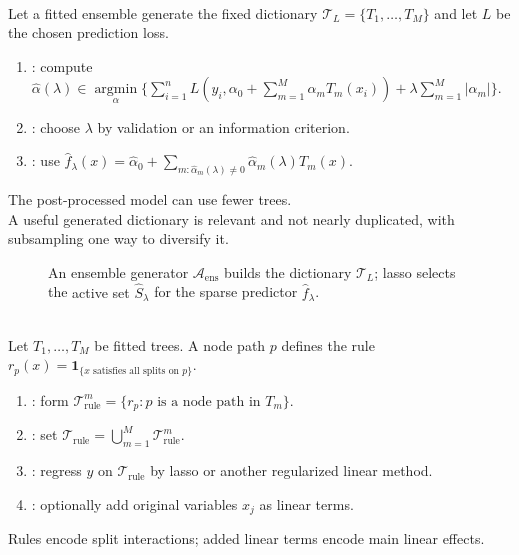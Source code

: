 \begin{method} \label{meth:sl-lasso-postprocessed-ensembles} \\
Let a fitted ensemble generate the fixed dictionary $\mathcal T_L=\{T_1,\ldots,T_M\}$ and let $L$ be the chosen prediction loss.
\begin{enumerate}[label=(\roman*)]
\setlength{\itemsep}{0pt}
\item {}: compute $\widehat{\alpha}(\lambda)\in\operatorname*{argmin}\limits_{\alpha}\{\sum\limits_{i=1}^n L(y_i,\alpha_0+\sum\limits_{m=1}^M\alpha_mT_m(x_i))+\lambda\sum\limits_{m=1}^M|\alpha_m|\}$.
\item {}: choose $\lambda$ by validation or an information criterion.
\item {}: use $\widehat f_\lambda(x)=\widehat\alpha_0+\sum\limits_{m:\widehat\alpha_m(\lambda)\neq0}\widehat\alpha_m(\lambda)T_m(x)$.
\end{enumerate}
The post-processed model can use fewer trees.\\
A useful generated dictionary is relevant and not nearly duplicated, with subsampling one way to diversify it.
\end{method}

\begin{figure}[H]
\centering

\caption{An ensemble generator $\mathcal A_{\mathrm{ens}}$ builds the \textcolor{green!45!black}{dictionary $\mathcal T_L$}; lasso selects the \textcolor{orange!80!black}{active set $\widehat S_\lambda$} for the sparse predictor $\widehat f_\lambda$.}
\label{fig:sl-ensemble-lasso-postprocessing}
\end{figure}

\begin{method} \label{meth:sl-rule-ensembles} \\
Let $T_1,\ldots,T_M$ be fitted trees.  A node path $p$ defines the rule $r_p(x)=\mathbf{1}_{\{x\text{ satisfies all splits on }p\}}$.
\begin{enumerate}[label=(\roman*)]
\setlength{\itemsep}{0pt}
\item {}: form $\mathcal T^m_{\mathrm{rule}}=\{r_p:p\text{ is a node path in }T_m\}$.
\item {}: set $\mathcal T_{\mathrm{rule}}=\bigcup\limits_{m=1}^M\mathcal T^m_{\mathrm{rule}}$.
\item {}: regress $y$ on $\mathcal T_{\mathrm{rule}}$ by lasso or another regularized linear method.
\item {}: optionally add original variables $x_j$ as linear terms.
\end{enumerate}
Rules encode split interactions; added linear terms encode main linear effects.
\end{method}
